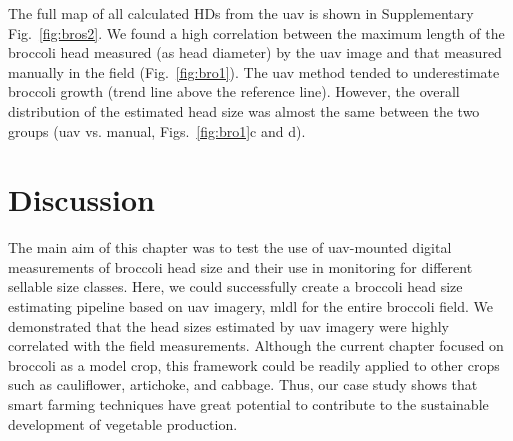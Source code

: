 The full map of all calculated HDs from the \gls{uav} is shown in Supplementary Fig.~\ref{fig:bros2}. We found a high correlation between the maximum length of the broccoli head measured (as head diameter) by the \gls{uav} image and that measured manually in the field (Fig.~\ref{fig:bro1}). The \gls{uav} method tended to underestimate broccoli growth (trend line above the reference line). However, the overall distribution of the estimated head size was almost the same between the two groups (\gls{uav} vs. manual, Figs.~\ref{fig:bro1}c and d). 




\section{Discussion}

The main aim of this chapter was to test the use of \gls{uav}-mounted digital measurements of broccoli head size and their use in monitoring for different sellable size classes. Here, we could successfully create a broccoli head size estimating pipeline based on \gls{uav} imagery, \gls{mldl} for the entire broccoli field. We demonstrated that the head sizes estimated by \gls{uav} imagery were highly correlated with the field measurements. Although the current chapter focused on broccoli as a model crop, this framework could be readily applied to other crops such as cauliflower, artichoke, and cabbage. Thus, our case study shows that smart farming techniques have great potential to contribute to the sustainable development of vegetable production.

